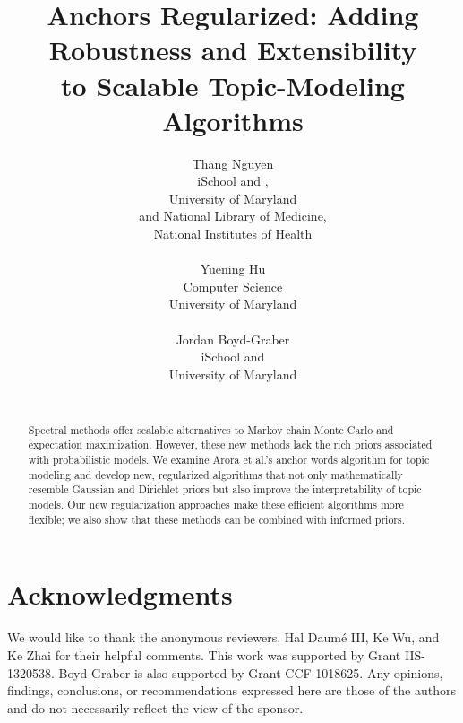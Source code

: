 \documentclass[11pt]{article}
\title{Anchors Regularized: Adding Robustness and Extensibility \\
to Scalable Topic-Modeling Algorithms}
\author{Thang Nguyen  \\
  iSchool and \abr{umiacs}, \\
  University of Maryland \\
  and National Library of Medicine, \\
  National Institutes of Health \\
  \email{daithang@umiacs.umd.edu} \\\And
  Yuening Hu \\
  Computer Science \\
  University of Maryland \\
  \email{ynhu@cs.umd.edu} \\ \And
  Jordan Boyd-Graber \\
  iSchool and \abr{umiacs} \\
  University of Maryland \\
  \email{jbg@umiacs.umd.edu} \\
}
\date{}
\begin{document}



\begin{abstract}
  Spectral methods offer scalable alternatives to Markov chain Monte
  Carlo and expectation maximization.  However, these new methods lack
  the rich priors associated with probabilistic models.  We examine
  Arora et al.'s anchor words algorithm for topic modeling and develop
  new, regularized algorithms that not only mathematically resemble
  Gaussian and Dirichlet priors but also improve the interpretability
  of topic models.  Our new regularization approaches make these
  efficient algorithms more flexible; we also show that these methods can
  be combined with informed priors.
\end{abstract}








\section*{Acknowledgments}

We would like to thank the anonymous reviewers, Hal Daum\'e III, Ke Wu,
and Ke Zhai for their helpful comments.  This work was supported by
 Grant IIS-1320538.  Boyd-Graber is also supported by
 Grant CCF-1018625.  Any opinions, findings, conclusions, or
recommendations expressed here are those of the authors and do not
necessarily reflect the view of the sponsor.

\newpage

%

%

\end{document}
